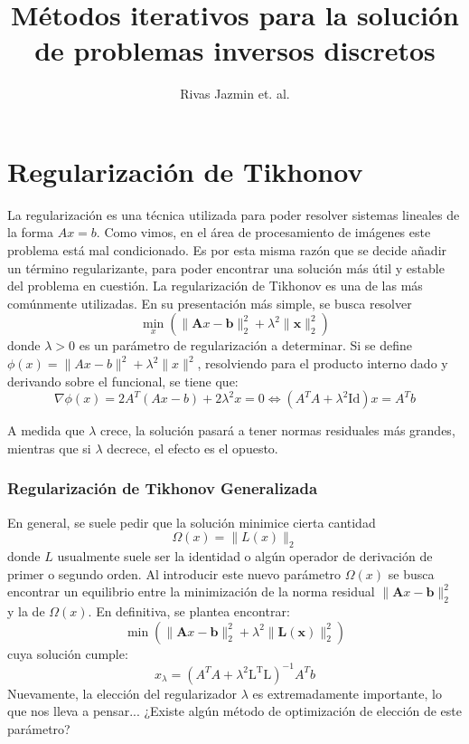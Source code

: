 \documentclass[12pt, oneside]{book}
\title{Métodos iterativos para la solución de problemas inversos discretos}
\author{Rivas Jazmin et. al.}
\date{}
\begin{document}
	\maketitle
	\tableofcontents
	
	
	\chapter{Regularización de Tikhonov}
	La regularización es una técnica utilizada para poder resolver sistemas lineales de la forma $Ax = b$. Como vimos, en el área de procesamiento de imágenes este problema está mal condicionado. Es por esta misma razón que se decide añadir un término regularizante, para poder encontrar una solución más útil y estable del problema en cuestión.
	La regularización de Tikhonov es una de las más comúnmente utilizadas. En su presentación más simple, se busca resolver \\[10pt]
	 \begin{equation}
	 	\min_{x} \left( \| \mathbf{A}x - \mathbf{b} \|_2^2 + \lambda^2 \| \mathbf{x} \|_2^2 \right)
	 \end{equation}
	 donde $\lambda > 0$ es un parámetro de regularización a determinar.
	 Si se define $\phi(x) = \|Ax - b\|^2 + \lambda^2 \|x\|^2$, resolviendo para el producto interno dado y derivando sobre el funcional, se tiene que:
	 \[
	 	\nabla \phi(x) = 2A^T(Ax - b) + 2\lambda^2 x = 0 \iff 
	 	\boxed{(A^TA + \lambda^2 \mathrm{Id})x = A^Tb}
	 \]
	 
	 A medida que $\lambda$ crece, la solución pasará a tener normas residuales más grandes, mientras que si $\lambda$ decrece, el efecto es el opuesto.
	
	\subsection{Regularización de Tikhonov Generalizada}
	 En general, se suele pedir que la solución minimice cierta cantidad 
	 \[
	 \Omega(x) = \| L(x) \|_2
	 \]
	 donde $L$ usualmente suele ser la identidad o algún operador de derivación de primer o segundo orden.
	Al introducir este nuevo parámetro $\Omega (x)$ se busca encontrar un equilibrio entre la minimización de la norma residual  $\| \mathbf{A}x - \mathbf{b} \|_2^2$ y la de $\Omega (x)$. En definitiva, se plantea encontrar:
	 \[
		\min \left( \| \mathbf{A}x - \mathbf{b} \|_2^2 + \lambda^2 \| \mathbf{L(x)} \|_2^2 \right)
	\]
	cuya solución cumple: 
	\begin{equation}
	\boxed{x_\lambda = (A^TA + \lambda^2 \mathrm{L^TL})^{-1}  A^Tb}
	\end{equation}
	 Nuevamente, la elección del regularizador $\lambda$ es extremadamente importante, lo que nos lleva a pensar... ¿Existe algún método de optimización de elección de este parámetro?
	
\end{document}
